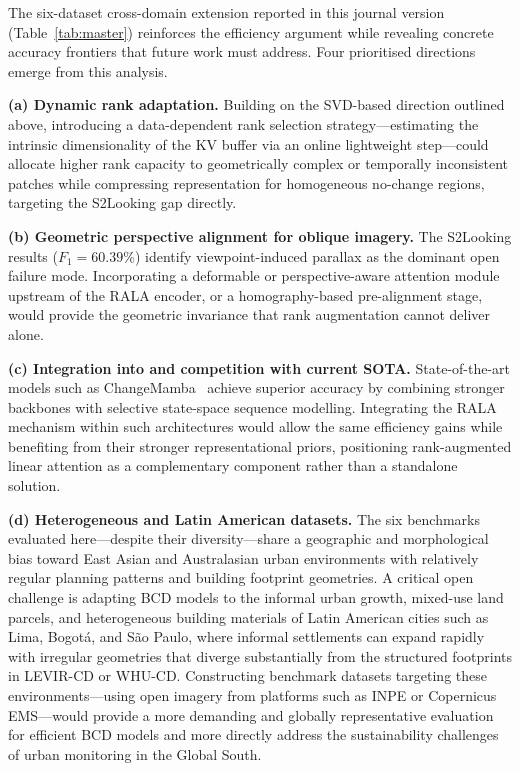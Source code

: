 \documentclass[runningheads]{llncs}
\newcommand{\journal}[1]{{\color{orange}#1}}
\begin{document}
\journal{%
The six-dataset cross-domain extension reported in this journal version
(Table~\ref{tab:master}) reinforces the efficiency argument while revealing
concrete accuracy frontiers that future work must address. Four prioritised
directions emerge from this analysis.

\noindent\textbf{(a) Dynamic rank adaptation.}
Building on the SVD-based direction outlined above, introducing a
data-dependent rank selection strategy—estimating the intrinsic dimensionality
of the KV buffer via an online lightweight step—could allocate higher rank
capacity to geometrically complex or temporally inconsistent patches while
compressing representation for homogeneous no-change regions, targeting the
S2Looking gap directly.

\noindent\textbf{(b) Geometric perspective alignment for oblique imagery.}
The S2Looking results ($F_1=60.39\%$) identify viewpoint-induced parallax as
the dominant open failure mode. Incorporating a deformable or
perspective-aware attention module upstream of the RALA encoder, or a
homography-based pre-alignment stage, would provide the geometric invariance
that rank augmentation cannot deliver alone.

\noindent\textbf{(c) Integration into and competition with current SOTA.}
State-of-the-art models such as ChangeMamba~\cite{Chen2024ChangeMamba} achieve
superior accuracy by combining stronger backbones with selective state-space
sequence modelling. Integrating the RALA mechanism within such architectures
would allow the same efficiency gains while benefiting from their stronger
representational priors, positioning rank-augmented linear attention as a
complementary component rather than a standalone solution.

\noindent\textbf{(d) Heterogeneous and Latin American datasets.}
The six benchmarks evaluated here—despite their diversity—share a geographic
and morphological bias toward East Asian and Australasian urban environments
with relatively regular planning patterns and building footprint geometries.
A critical open challenge is adapting BCD models to the informal urban growth,
mixed-use land parcels, and heterogeneous building materials of Latin American
cities such as Lima, Bogotá, and São Paulo, where informal settlements can
expand rapidly with irregular geometries that diverge substantially from the
structured footprints in LEVIR-CD or WHU-CD. Constructing benchmark datasets
targeting these environments—using open imagery from platforms such as INPE
or Copernicus EMS—would provide a more demanding and globally representative
evaluation for efficient BCD models and more directly address the sustainability
challenges of urban monitoring in the Global South.%
}
\end{document}
